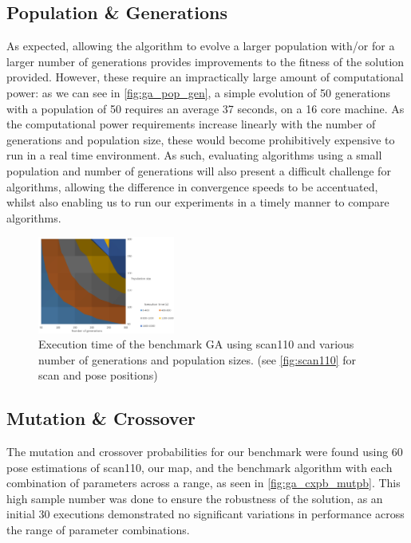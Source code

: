 \documentclass[authoryearcitations]{UoYCSproject}
\begin{document}
\subsection{Population \& Generations}
As expected, allowing the algorithm to evolve a larger population with/or for a larger number of generations provides improvements to the fitness of the solution provided. However, these require an impractically large amount of computational power: as we can see in \autoref{fig:ga_pop_gen}, a simple evolution of 50 generations with a population of 50 requires an average 37 seconds, on a 16 core machine. As the computational power requirements increase linearly with the number of generations and population size, these would become prohibitively expensive to run in a real time environment. As such, evaluating algorithms using a small population and number of generations will also present a difficult challenge for algorithms, allowing the difference in convergence speeds to be accentuated, whilst also enabling us to run our experiments in a timely manner to compare algorithms. 
\begin{figure}[ht]
\centering
	\includegraphics[width=0.4\textwidth,keepaspectratio]{images/ga_pop_gen_sweep.png}
	\caption{Execution time of the benchmark GA using scan110 and various number of generations and population sizes. (see \autoref{fig:scan110} for scan and pose positions)}
	\label{fig:ga_pop_gen}
\end{figure}

\subsection{Mutation \& Crossover}
\label{subsec:benchmark_mutpb_cxpb}
The mutation and crossover probabilities for our benchmark were found using 60 pose estimations of scan110, our map, and the benchmark algorithm with each combination of parameters across a range, as seen in \autoref{fig:ga_cxpb_mutpb}. This high sample number was done to ensure the robustness of the solution, as an initial 30 executions demonstrated no significant variations in performance across the range of parameter combinations. 
\end{document}
